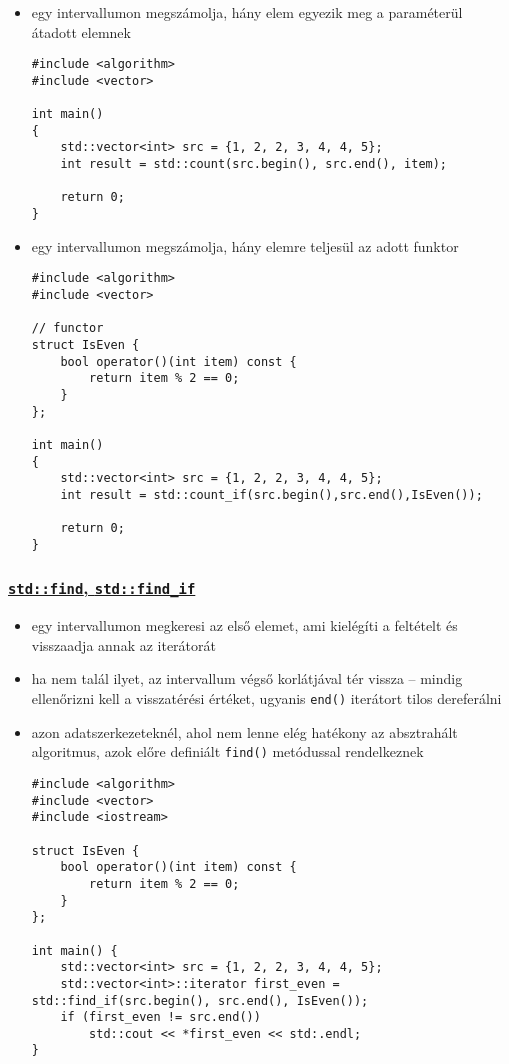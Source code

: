\documentclass[a4paper, 11pt, oneside]{book}
\begin{document}
\begin{itemize}
	\item egy intervallumon megszámolja, hány elem egyezik meg a paraméterül átadott elemnek
	
	\begin{lstlisting}[style=cppstyle]
#include <algorithm>
#include <vector>

int main() 
{
	std::vector<int> src = {1, 2, 2, 3, 4, 4, 5};
	int result = std::count(src.begin(), src.end(), item);
	
	return 0;
}
	\end{lstlisting}

	\item egy intervallumon megszámolja, hány elemre teljesül az adott funktor
	
	\begin{lstlisting}[style=cppstyle]
#include <algorithm>
#include <vector>

// functor
struct IsEven { 
	bool operator()(int item) const {
		return item % 2 == 0;
	}
};
		
int main() 
{
	std::vector<int> src = {1, 2, 2, 3, 4, 4, 5};	
	int result = std::count_if(src.begin(),src.end(),IsEven());
	
	return 0;
}
	\end{lstlisting}
\end{itemize}


\subsubsection{\underline{\texttt{std::find}, \texttt{std::find\_if}}}

\begin{itemize}
	\item egy intervallumon megkeresi az első elemet, ami kielégíti a feltételt és visszaadja annak az iterátorát
	\item ha nem talál ilyet, az intervallum végső korlátjával tér vissza -- mindig ellenőrizni kell a visszatérési értéket, ugyanis \verb*|end()| iterátort tilos dereferálni
	\item azon adatszerkezeteknél, ahol nem lenne elég hatékony az absztrahált algoritmus, azok előre definiált \verb*|find()| metódussal rendelkeznek
	
	\begin{lstlisting}[style=cppstyle]
#include <algorithm>
#include <vector>
#include <iostream>

struct IsEven { 
	bool operator()(int item) const {
		return item % 2 == 0;
	}
};
		
int main() {
	std::vector<int> src = {1, 2, 2, 3, 4, 4, 5};	
	std::vector<int>::iterator first_even = std::find_if(src.begin(), src.end(), IsEven());
	if (first_even != src.end()) 
		std::cout << *first_even << std:.endl;
}
	\end{lstlisting}
\end{itemize}
\end{document}
